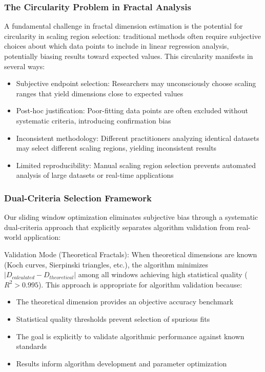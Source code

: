 \documentclass[preprint,12pt]{elsarticle}
\def\textbf#1{#1}%
\begin{document}
\subsubsection{The Circularity Problem in Fractal Analysis}

A fundamental challenge in fractal dimension estimation is the potential for circularity in scaling region selection: traditional methods often require subjective choices about which data points to include in linear regression analysis, potentially biasing results toward expected values. This circularity manifests in several ways:

\begin{itemize}
\item \textbf{Subjective endpoint selection}: Researchers may unconsciously choose scaling ranges that yield dimensions close to expected values
\item \textbf{Post-hoc justification}: Poor-fitting data points are often excluded without systematic criteria, introducing confirmation bias
\item \textbf{Inconsistent methodology}: Different practitioners analyzing identical datasets may select different scaling regions, yielding inconsistent results
\item \textbf{Limited reproducibility}: Manual scaling region selection prevents automated analysis of large datasets or real-time applications
\end{itemize}

\subsubsection{Dual-Criteria Selection Framework}

Our sliding window optimization eliminates subjective bias through a systematic dual-criteria approach that explicitly separates algorithm validation from real-world application:

\textbf{Validation Mode (Theoretical Fractals)}:
When theoretical dimensions are known (Koch curves, Sierpinski triangles, etc.), the algorithm minimizes $|D_{calculated} - D_{theoretical}|$ among all windows achieving high statistical quality ($R^2 > 0.995$). This approach is appropriate for algorithm validation because:
\begin{itemize}
\item The theoretical dimension provides an objective accuracy benchmark
\item Statistical quality thresholds prevent selection of spurious fits
\item The goal is explicitly to validate algorithmic performance against known standards
\item Results inform algorithm development and parameter optimization
\end{itemize}
\end{document}
